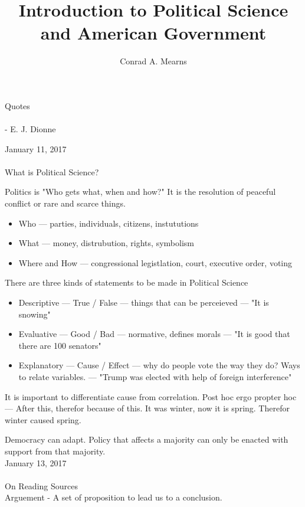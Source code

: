 \documentclass{article}
\title{Introduction to Political Science and American Government}
\author{Conrad A. Mearns}
\begin{document}
\maketitle

\noindent
\Large Quotes\\\\
\normalsize
{} - E. J. Dionne

\noindent
\Large January 11, 2017\\\\
What is Political Science?
\normalsize

\noindent
Politics is "Who gets what, when and how?" It is the resolution of peaceful conflict or rare and scarce things.
\begin{itemize}
  \item Who --- parties, individuals, citizens, instututions
  \item What --- money, distrubution, rights, symbolism
  \item Where and How --- congressional legistlation, court, executive order, voting
\end{itemize}

\noindent
There are three kinds of statements to be made in Political Science
\begin{itemize}
  \item Descriptive --- True / False --- things that can be perceieved --- "It is snowing"
  \item Evaluative --- Good / Bad --- normative, defines morals --- "It is good that there are 100 senators"
  \item Explanatory --- Cause / Effect --- why do people vote the way they do? Ways to relate variables. --- "Trump was elected with help of foreign interference"
\end{itemize}

\noindent
It is important to differentiate cause from correlation. Post hoc ergo propter hoc --- After this, therefor because of this. It was winter, now it is spring. Therefor winter caused spring.

\noindent
Democracy can adapt. Policy that affects a majority can only be enacted with support from that majority.\\

\noindent
\Large January 13, 2017\\\\
On Reading Sources\\
\normalsize
\noindent
Arguement - A set of proposition to lead us to a conclusion.
\end{document}
